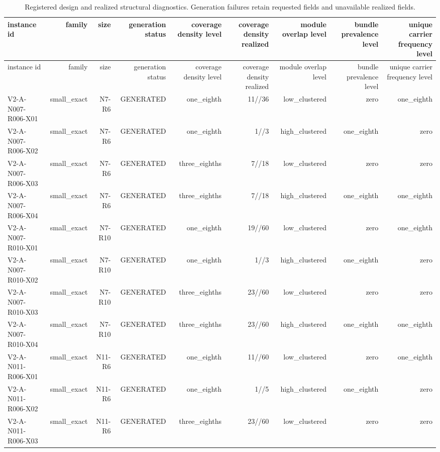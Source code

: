 {\footnotesize
\begin{longtable}{lrrrrrrrr}
\caption{Registered design and realized structural diagnostics. Generation failures retain requested fields and unavailable realized fields.}\label{tab:aor-design-realized}\\
\toprule
instance id & family & size & generation status & coverage density level & coverage density realized & module overlap level & bundle prevalence level & unique carrier frequency level \\
\midrule
\endfirsthead
\toprule
instance id & family & size & generation status & coverage density level & coverage density realized & module overlap level & bundle prevalence level & unique carrier frequency level \\
\midrule
\endhead
V2-A-N007-R006-X01 & small\_exact & N7-R6 & GENERATED & one\_eighth & 11//36 & low\_clustered & zero & one\_eighth \\
V2-A-N007-R006-X02 & small\_exact & N7-R6 & GENERATED & one\_eighth & 1//3 & high\_clustered & one\_eighth & zero \\
V2-A-N007-R006-X03 & small\_exact & N7-R6 & GENERATED & three\_eighths & 7//18 & low\_clustered & zero & zero \\
V2-A-N007-R006-X04 & small\_exact & N7-R6 & GENERATED & three\_eighths & 7//18 & high\_clustered & one\_eighth & one\_eighth \\
V2-A-N007-R010-X01 & small\_exact & N7-R10 & GENERATED & one\_eighth & 19//60 & low\_clustered & zero & one\_eighth \\
V2-A-N007-R010-X02 & small\_exact & N7-R10 & GENERATED & one\_eighth & 1//3 & high\_clustered & one\_eighth & zero \\
V2-A-N007-R010-X03 & small\_exact & N7-R10 & GENERATED & three\_eighths & 23//60 & low\_clustered & zero & zero \\
V2-A-N007-R010-X04 & small\_exact & N7-R10 & GENERATED & three\_eighths & 23//60 & high\_clustered & one\_eighth & one\_eighth \\
V2-A-N011-R006-X01 & small\_exact & N11-R6 & GENERATED & one\_eighth & 11//60 & low\_clustered & zero & one\_eighth \\
V2-A-N011-R006-X02 & small\_exact & N11-R6 & GENERATED & one\_eighth & 1//5 & high\_clustered & one\_eighth & zero \\
V2-A-N011-R006-X03 & small\_exact & N11-R6 & GENERATED & three\_eighths & 23//60 & low\_clustered & zero & zero \\

\end{longtable}}
